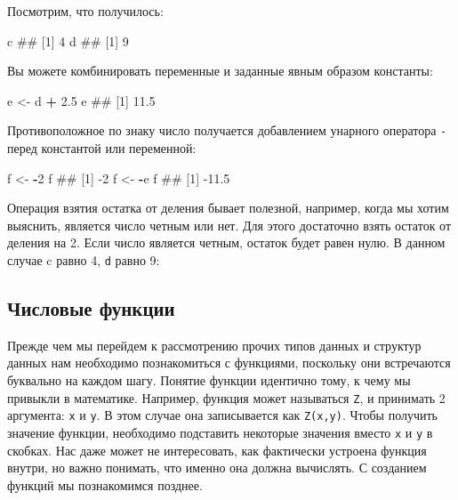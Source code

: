 \documentclass[]{book}
\newenvironment{Shaded}{\begin{snugshade}}{\end{snugshade}}
\newcommand{\DecValTok}[1]{\textcolor[rgb]{0.00,0.00,0.81}{#1}}
\newcommand{\FloatTok}[1]{\textcolor[rgb]{0.00,0.00,0.81}{#1}}
\newcommand{\StringTok}[1]{\textcolor[rgb]{0.31,0.60,0.02}{#1}}
\newcommand{\OperatorTok}[1]{\textcolor[rgb]{0.81,0.36,0.00}{\textbf{#1}}}
\newcommand{\NormalTok}[1]{#1}
\begin{document}
Посмотрим, что получилось:

\begin{Shaded}
\begin{Highlighting}[]
\NormalTok{c}
\NormalTok{## [1] 4}
\NormalTok{d}
\NormalTok{## [1] 9}
\end{Highlighting}
\end{Shaded}

Вы можете комбинировать переменные и заданные явным образом константы:

\begin{Shaded}
\begin{Highlighting}[]
\NormalTok{e <-}\StringTok{ }\NormalTok{d }\OperatorTok{+}\StringTok{ }\FloatTok{2.5}
\NormalTok{e}
\NormalTok{## [1] 11.5}
\end{Highlighting}
\end{Shaded}

Противоположное по знаку число получается добавлением унарного оператора
\texttt{-} перед константой или переменной:

\begin{Shaded}
\begin{Highlighting}[]
\NormalTok{f <-}\StringTok{ }\OperatorTok{-}\DecValTok{2}
\NormalTok{f}
\NormalTok{## [1] -2}
\NormalTok{f <-}\StringTok{ }\OperatorTok{-}\NormalTok{e}
\NormalTok{f}
\NormalTok{## [1] -11.5}
\end{Highlighting}
\end{Shaded}

Операция взятия остатка от деления бывает полезной, например, когда мы
хотим выяснить, является число четным или нет. Для этого достаточно
взять остаток от деления на 2. Если число является четным, остаток будет
равен нулю. В данном случае c равно 4, \texttt{d} равно 9:

\begin{Shaded}
\end{Shaded}

\subsection{Числовые функции}\label{number_functions}

Прежде чем мы перейдем к рассмотрению прочих типов данных и структур
данных нам необходимо познакомиться с функциями, поскольку они
встречаются буквально на каждом шагу. Понятие функции идентично тому, к
чему мы привыкли в математике. Например, функция может называться
\texttt{Z}, и принимать 2 аргумента: \texttt{x} и \texttt{y}. В этом
случае она записывается как \texttt{Z(x,y)}. Чтобы получить значение
функции, необходимо подставить некоторые значения вместо \texttt{x} и
\texttt{y} в скобках. Нас даже может не интересовать, как фактически
устроена функция внутри, но важно понимать, что именно она должна
вычислять. С созданием функций мы познакомимся позднее.
\end{document}
